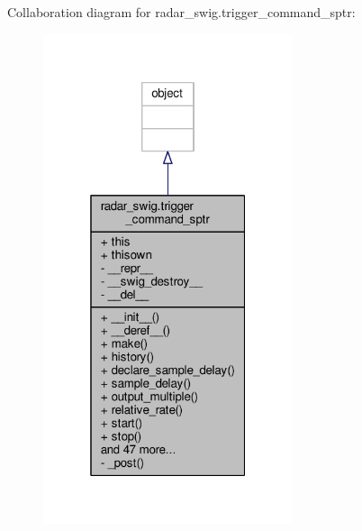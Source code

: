 Collaboration diagram for radar\+\_\+swig.\+trigger\+\_\+command\+\_\+sptr\+:
\nopagebreak
\begin{figure}[H]
\begin{center}
\leavevmode
\includegraphics[width=208pt]{d7/d35/classradar__swig_1_1trigger__command__sptr__coll__graph}
\end{center}
\end{figure}
